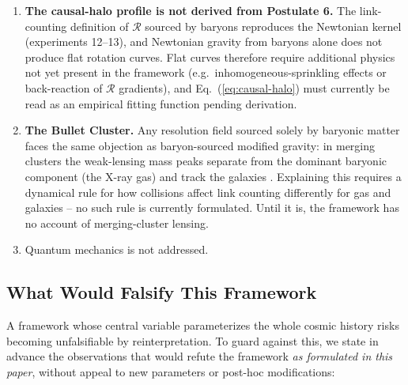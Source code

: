 \documentclass[12pt]{article}
\begin{document}
\begin{enumerate}
\item {\bf The causal-halo profile is not derived from Postulate 6.} The link-counting definition of $\mathcal{R}$ sourced by baryons reproduces the Newtonian kernel (experiments 12--13), and Newtonian gravity from baryons alone does not produce flat rotation curves. Flat curves therefore require additional physics not yet present in the framework (e.g.\ inhomogeneous-sprinkling effects or back-reaction of $\mathcal{R}$ gradients), and Eq.~(\ref{eq:causal-halo}) must currently be read as an empirical fitting function pending derivation.
\item {\bf The Bullet Cluster.} Any resolution field sourced solely by baryonic matter faces the same objection as baryon-sourced modified gravity: in merging clusters the weak-lensing mass peaks separate from the dominant baryonic component (the X-ray gas) and track the galaxies \citep{clowe2006}. Explaining this requires a dynamical rule for how collisions affect link counting differently for gas and galaxies -- no such rule is currently formulated. Until it is, the framework has no account of merging-cluster lensing.
\item Quantum mechanics is not addressed.
\end{enumerate}

\subsection{What Would Falsify This Framework}
\label{sec:falsifiers}

A framework whose central variable parameterizes the whole cosmic history risks becoming unfalsifiable by reinterpretation. To guard against this, we state in advance the observations that would refute the framework \emph{as formulated in this paper}, without appeal to new parameters or post-hoc modifications:
\end{document}
